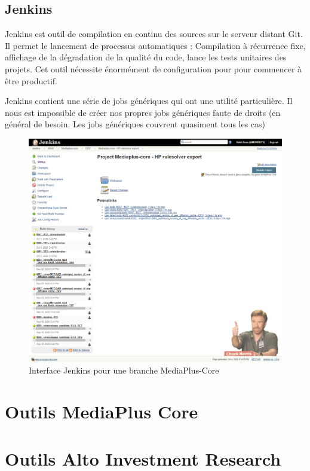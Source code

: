 \subsection{Jenkins}
\par Jenkins est outil de compilation en continu des sources sur le serveur distant  Git. Il permet le lancement de processus automatiques : Compilation à  récurrence fixe, affichage de la dégradation de la qualité du code, lance les  tests unitaires des projets. Cet outil nécessite énormément de configuration  pour pour commencer à être productif. 
\par Jenkins contient une série de jobs génériques qui ont une utilité particulière. Il  nous est impossible de créer nos propres jobs génériques faute de droits (en  général de besoin. Les jobs génériques couvrent quasiment tous les cas)
\begin{figure}[ht]
    \centering
    \includegraphics[width=\columnwidth]{img/jenkins.png}
    \caption{Interface Jenkins pour une branche MediaPlus-Core}
\end{figure}
\section{Outils MediaPlus Core}
\section{Outils Alto Investment Research}